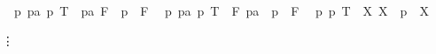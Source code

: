 \begin{isabellebody}
\begin{isamarkuptxt}
\begin{isabelle}
\ {}{\isachardot}\ {\isasymAnd}p\ pa{\isachardot}\ {\isacharparenleft}p{\isacharcomma}\ T{\isacharparenright}\ {\isacharequal}\ {\isacharparenleft}pa{\isacharcomma}\ F{\isacharparenright}\ {\isasymLongrightarrow}\ p\ {\isacharequal}\ F\isanewline
\ {}{\isachardot}\ {\isasymAnd}p\ pa{\isachardot}\ {\isacharparenleft}p{\isacharcomma}\ T{\isacharparenright}\ {\isacharequal}\ {\isacharparenleft}F{\isacharcomma}\ pa{\isacharparenright}\ {\isasymLongrightarrow}\ p\ {\isacharequal}\ F\isanewline
\ {}{}{\isachardot}\ {\isasymAnd}p{\isachardot}\ {\isacharparenleft}p{\isacharcomma}\ T{\isacharparenright}\ {\isacharequal}\ {\isacharparenleft}X{\isacharcomma}\ X{\isacharparenright}\ {\isasymLongrightarrow}\ p\ {\isacharequal}\ X%
\end{isabelle}\vspace{-1.2em}\hspace{3cm}\vdots\vspace{1.2em}


\end{isamarkuptxt}
\end{isabellebody}
